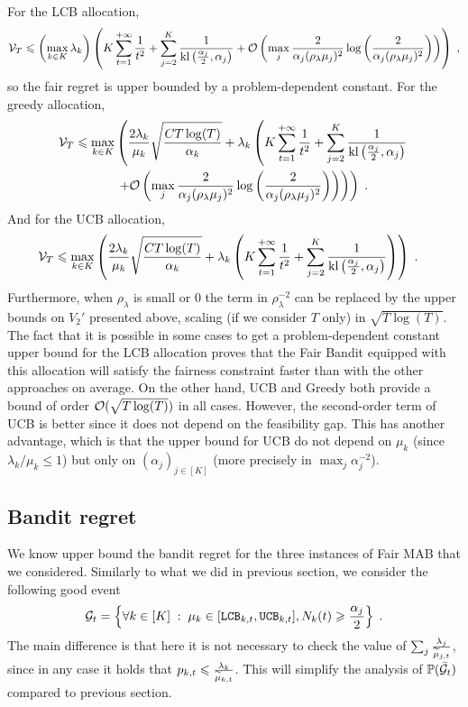 For the LCB allocation,
	\[\mathcal{V}_T \leqslant \left(\max_{k \in K}\lambda_k\right) \left( K \sum_{t=1}^{+\infty} \frac{1}{t^2} + \sum_{j=2}^K\frac{1}{\text{\normalfont kl}\left(\frac{\alpha_j}{2}, \alpha_j\right)} + \mathcal{O}\left(\max_j\frac{2}{\alpha_j(\rho_\lambda \mu_j)^2}\log\left(\frac{2}{\alpha_j(\rho_\lambda \mu_j)^2}\right)\right)\right) \;, \]
so the fair regret is upper bounded by a problem-dependent constant. For the greedy allocation, 
	\begin{align*} \mathcal{V}_T \leqslant \max_{k\in K} &\left(\frac{2\lambda_k}{\mu_k}\sqrt{\frac{C T \log(T)}{\alpha_k}}+ \lambda_k\left(K \sum_{t=1}^{+\infty} \frac{1}{t^2} + \sum_{j=2}^K\frac{1}{\text{\normalfont kl}\left(\frac{\alpha_j}{2}, \alpha_j\right)} \right.\right. \\
	& \left.\left. + \mathcal{O}\left(\max_j\frac{2}{\alpha_j(\rho_\lambda \mu_j)^2}\log\left(\frac{2}{\alpha_j(\rho_\lambda \mu_j)^2}\right)\right)\right)\right) \;. \end{align*}
And for the UCB allocation, 
		\begin{align*} \mathcal{V}_T \leqslant \max_{k\in K} &\left(\frac{2\lambda_k}{\mu_k}\sqrt{\frac{C T \log(T)}{\alpha_k}}+ \lambda_k\left(K \sum_{t=1}^{+\infty} \frac{1}{t^2} + \sum_{j=2}^K\frac{1}{\text{\normalfont kl}\left(\frac{\alpha_j}{2}, \alpha_j\right)}\right)\right) \;. \end{align*}
Furthermore, when $\rho_\lambda$ is small or $0$ the term in $\rho_\lambda^{-2}$ can be replaced by the upper bounds on $V_2'$ presented above, scaling (if we consider $T$ only) in $\sqrt{T\log(T)}$. The fact that it is possible in some cases to get a problem-dependent constant upper bound for the LCB allocation proves that the Fair Bandit equipped with this allocation will satisfy the fairness constraint faster than with the other approaches on average. On the other hand, UCB and Greedy both provide a bound of order $\mathcal{O}(\sqrt{T\log(T)})$ in all cases. However, the second-order term of UCB is better since it does not depend on the feasibility gap. This has another advantage, which is that the upper bound for UCB do not depend on $\mu_k$ (since $\lambda_k/\mu_k \leq 1$) but only on $(\alpha_j)_{j \in [K]}$ (more precisely in $\max_j \alpha_j^{-2}$).

\subsection{Bandit regret}

We know upper bound the bandit regret for the three instances of Fair MAB that we considered. Similarly to what we did in previous section, we consider the following good event
 \[\mathcal{G}_t=\left\{ \forall k \in [K]\;:\; \mu_k \in [\texttt{LCB}_{k, t}, \texttt{UCB}_{k, t}], N_k(t)\geqslant \frac{\alpha_j}{2} \right\}\;.\]
 The main difference is that here it is not necessary to check the value of $\sum_j \frac{\lambda_j}{\widetilde{\mu}_{j,t}}$, since in any case it holds that $p_{k,t}\leqslant \frac{\lambda_k}{\widetilde{\mu}_{k,t}}$. This will simplify the analysis of $\mathbb{P}(\bar {\mathcal{G}}_t)$ compared to previous section.

